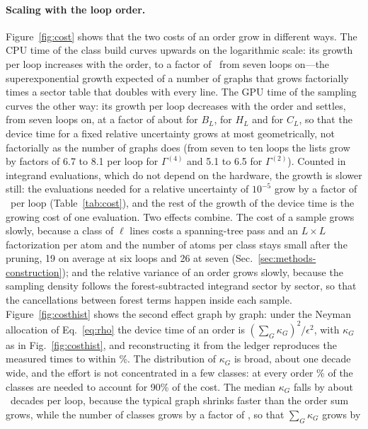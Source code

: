 \paragraph{Scaling with the loop order.}
Figure~\ref{fig:cost} shows that the two costs of an order grow in different ways. The CPU time of the class build
curves upwards on the logarithmic scale: its growth per loop increases with the order, to a factor of \cpugrowthrange\
from seven loops on---the superexponential growth expected of a number of graphs that grows factorially times a sector
table that doubles with every line. The GPU time of the sampling curves the other way: its growth per loop decreases
with the order and settles, from seven loops on, at a factor of about \costgrowth{b} for $B_L$, \costgrowth{h} for
$H_L$ and \costgrowth{c} for $C_L$, so that the device time for a fixed relative uncertainty grows at most geometrically,
not factorially as the number of graphs does (from seven to ten loops the lists grow by factors of 6.7 to 8.1 per loop
for $\Gamma^{(4)}$ and 5.1 to 6.5 for $\Gamma^{(2)}$). Counted in
integrand evaluations, which do not depend on the hardware, the growth is slower still: the evaluations needed for a
relative uncertainty of $10^{-5}$ grow by a factor of \evalgrowthrange\ per loop (Table~\ref{tab:cost}), and the rest of
the growth of the device time is the growing cost of one evaluation. Two effects combine. The cost of a sample grows slowly,
because a class of $\ell$ lines costs a spanning-tree pass and an $L\times L$ factorization per atom and the number of
atoms per class stays small after the pruning, 19 on average at six loops and 26 at seven
(Sec.~\ref{sec:methods-construction}); and
the relative variance of an order grows slowly, because the sampling density follows the forest-subtracted
integrand sector by sector, so that the cancellations between forest terms happen inside each sample.
Figure~\ref{fig:costhist} shows the second effect graph by graph: under the Neyman allocation of Eq.~\eqref{eq:rho}
the device time of an order is $(\sum_G\kappa_G)^2/\epsilon^2$, with $\kappa_G$ as in Fig.~\ref{fig:costhist}, and
reconstructing it from the ledger reproduces the measured times to within \costkappadev\%. The distribution of
$\kappa_G$ is broad, about one decade wide, and the effort is not concentrated in a few classes: at every order
\costninetyrange\% of the classes are needed to account for 90\% of the cost. The median
$\kappa_G$ falls by about \kappashift\ decades per loop, because the typical graph shrinks faster than the
order sum grows, while the number of classes grows by a factor of \graphgrowthrange, so that $\sum_G\kappa_G$ grows by
